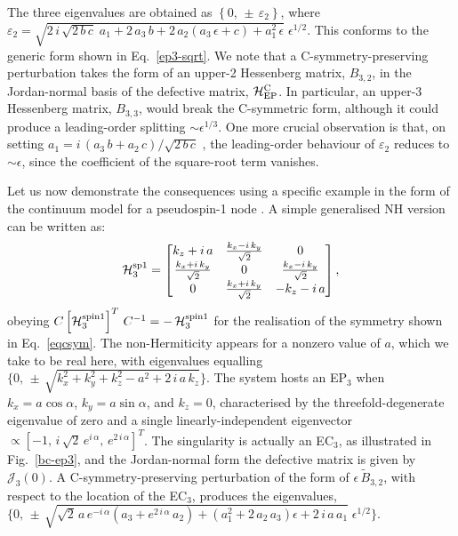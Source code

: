 \documentclass[aps, prb, onecolumn, nofootinbib, citeautoscript, 10pt]{revtex4-2}
\begin{document}
The three eigenvalues are obtained as $\left\{0, \, \pm \,\varepsilon_2 \right\}$, where $ \varepsilon_2 =
\sqrt{2\, i\, \sqrt{2\, b\, c} \; a_1 + 2 \, a_3\, b + 2 \, a_2 \left(a_3\, \epsilon +c\right) + a_1^2 \,\epsilon }
\; \epsilon^{1/2} $. This conforms to the generic form shown in Eq.~\eqref{ep3-sqrt}.
We note that a C-symmetry-preserving perturbation takes the form of an upper-2 Hessenberg matrix, $B_{3,2}$, in the Jordan-normal basis of the defective matrix, ${\mathcal H^{\rm C}_{\rm EP}} $. In particular, an upper-3 Hessenberg matrix, $B_{3,3}$, would break the C-symmetric form, although it could produce a leading-order splitting $\sim \epsilon^{1/3}$. One more crucial observation is that, on setting $ a_1 =  {i\, \left(a_3\, b
+ a_2 \, c\right)} /{\sqrt{2\, b\, c}} $ , the leading-order behaviour of $\varepsilon_2$ reduces to $\sim \epsilon $, since the coefficient of the square-root term vanishes.




Let us now demonstrate the consequences using a specific example in the form of the continuum model for a pseudospin-1 node \cite{ips-spin1-ph, ips-internode, ips-exact-spin1}. A simple generalised NH version can be written as:
\begin{align}
\label{eqtsm}
\mathcal H^{\rm sp1}_3 = \begin{bmatrix}
 k_z+ i \,a & \frac{k_x-i \,k_y}{\sqrt{2}} & 0 \\
 \frac{k_x + i \,k_y}{\sqrt{2}} & 0 & \frac{k_x-i \,k_y}{\sqrt{2}} \\
 0 & \frac{k_x+i\, k_y}{\sqrt{2}} & -k_z-i \,a \\
\end{bmatrix},
\end{align}
obeying $C \left[\mathcal H^{\rm spin1}_3\right]^T\, C^{-1} = - \, \mathcal H^{\rm spin1}_3 $ for the realisation of the symmetry shown in Eq.~\eqref{eqcsym}. The non-Hermiticity appears for a nonzero value of $a$, which we take to be real here, with eigenvalues equalling $\lbrace
0, \, \pm \,\sqrt{k_x^2+k_y^2+k_z^2- a^2 + 2 \,i\, a\, k_z } \rbrace $. The system hosts an EP$_3$ when $ k_x = a \cos \alpha $, $ k_y = a \sin \alpha $, and $ k_z = 0 $, characterised by the threefold-degenerate eigenvalue of zero and a single linearly-independent eigenvector $\propto \left [  -1, \,i \,\sqrt{2}\, e^{i \,\alpha }, \,e^{2\, i\, \alpha } \right]^T $. 
The singularity is actually an EC$_3$, as illustrated in Fig.~\ref{bc-ep3}, and the Jordan-normal form the defective matrix is given by $ \mathcal {J}_3 (0) $. A C-symmetry-preserving perturbation of the form of $ \epsilon\, \tilde B_{3,2}$, with respect to the location of the EC$_3$, produces the eigenvalues, $\lbrace 0,\, \pm \,
\sqrt{ \sqrt{2} \,  a  \, e^{-i  \, \alpha } \left(a_3 + e^{2  \, i  \, \alpha } \,  a_2\right)+\left(a_1^2 + 2 \, a_2 \,  a_3\right) \epsilon +2 \,  i  \, a \,  a_1} \; \epsilon^{1/2} \rbrace $. 
\end{document}
